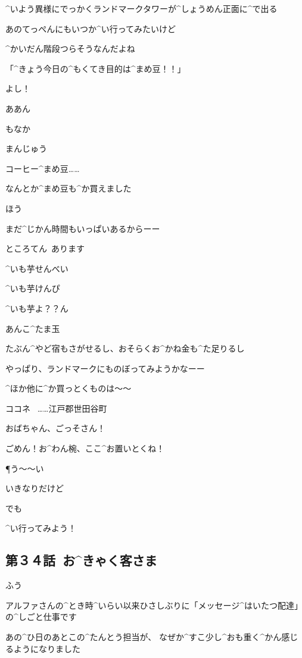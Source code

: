 \A ^{いよう}{異様}にでっかくランドマークタワーが^{しょうめん}{正面}に^{で}{出}る

\page
\A あのてっぺんにもいつか^{い}{行}ってみたいけど

\A ^{かいだん}{階段}つらそうなんだよね

\page
\A 「^{きょう}{今日}の^{もくてき}{目的}は^{まめ}{豆}！！」

\A よし！

\page
\A ああん

\Sign もなか

\Sign まんじゅう

\A コーヒー^{まめ}{豆}……

\A なんとか^{まめ}{豆}も^{か}{買}えました

\A ほう

\page
\A まだ^{じかん}{時間}もいっぱいあるからーー

\Sign ところてん\ あります

\Sign ^{いも}{芋}せんべい

\Sign ^{いも}{芋}けんぴ

\Sign ^{いも}{芋}よ？？ん

\Sign あんこ^{たま}{玉}

\A たぶん^{やど}{宿}もさがせるし、おそらくお^{かね}{金}も^{た}{足}りるし

\page
\A やっぱり、ランドマークにものぼってみようかなーー

\A ^{ほか}{他}に^{か}{買}っとくものは〜〜

\page
\Sign ココネ
\ ……江戸郡世田谷町

\page[23]
\A おばちゃん、ごっそさん！

\A ごめん！お^{わん}{椀}、ここ^{お}{置}いとくね！

\P う〜〜い

\page
\A いきなりだけど

\A でも

\A ^{い}{行}ってみよう！


\subsection{第３４話\ お^{きゃく}{客}さま}

\page[26]
\K ふう

\K アルファさんの^{とき}{時}^{いらい}{以来}ひさしぶりに「メッセージ^{はいたつ}{配達}」の^{しごと}{仕事}です

\page
\K あの^{ひ}{日}のあとこの^{たんとう}{担当}が、
なぜか^{すこ}{少}し^{おも}{重}く^{かん}{感}じるようになりました

